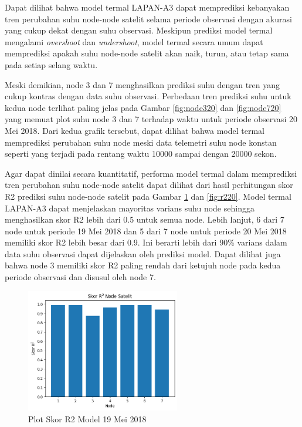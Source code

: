 Dapat dilihat bahwa model termal LAPAN-A3 dapat memprediksi kebanyakan tren
perubahan suhu node-node satelit selama periode observasi dengan akurasi yang
cukup dekat dengan suhu observasi. Meskipun prediksi model termal mengalami
\textit{overshoot} dan \textit{undershoot}, model termal secara umum dapat
memprediksi apakah suhu node-node satelit akan naik, turun, atau tetap sama
pada setiap selang waktu.

Meski demikian, node 3 dan 7 menghasilkan prediksi suhu
dengan tren yang cukup kontras dengan data suhu observasi. Perbedaan tren
prediksi suhu untuk kedua node terlihat paling jelas pada Gambar \ref{fig:node320}
dan \ref{fig:node720} yang memuat plot suhu node 3 dan 7 terhadap waktu untuk
periode observasi 20 Mei 2018. Dari kedua grafik tersebut, dapat dilihat bahwa
model termal memprediksi perubahan suhu node meski data telemetri suhu node
konstan seperti yang terjadi pada rentang waktu 10000 sampai dengan 20000
sekon.

Agar dapat dinilai secara kuantitatif, performa model termal dalam memprediksi
tren perubahan suhu node-node satelit dapat dilihat dari hasil perhitungan skor
R2 prediksi suhu node-node satelit pada Gambar \ref{fig:r219} dan
\ref{fig:r220}. Model termal LAPAN-A3 dapat menjelaskan mayoritas varians suhu
node sehingga menghasilkan skor R2 lebih dari 0.5 untuk semua node. Lebih
lanjut, 6 dari 7 node untuk periode 19 Mei 2018 dan 5 dari 7 node untuk periode
20 Mei 2018 memiliki skor R2 lebih besar dari 0.9. Ini berarti lebih dari 90\%
varians dalam data suhu observasi dapat dijelaskan oleh prediksi model. Dapat
dilihat juga bahwa node 3 memiliki skor R2 paling rendah dari ketujuh node pada
kedua periode observasi dan disusul oleh node 7.

\begin{figure}[H]
\setlength{}
\begin{center}
\includegraphics[width=0.6\textwidth]{fig/r2_2018-05-19.png}
\caption{Plot Skor R2 Model 19 Mei 2018}
\label{fig:r219}
\end{center}
\end{figure}

